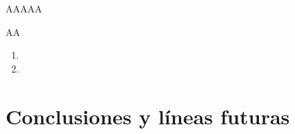 \documentclass[10pt,spanish,xcolor={svgnames}]{beamer}
\newcommand{\themename}{\textbf{\textsc{metropolis}}\xspace}
\begin{document}
\begin{frame}{AAAAA}
\vspace*{-2em}
\begin{exampleblock}{AA}
\begin{enumerate}
\item
\vspace{1em}
\item\end{enumerate}
\end{exampleblock}
\note{\large \vfill
	\begin{center}
		\begin{enumerate}
			\item  
			\vspace{2em}	
			\item  
			\vspace{2em}
			\item  
			\vspace{2em}
			\vfill
		\end{enumerate}
\end{center}}
\end{frame}

\section{Conclusiones y líneas futuras}












\end{document}
